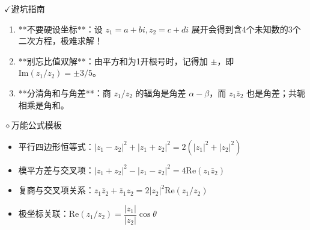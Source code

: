 \documentclass{exam-zh}
\newcommand{\eduIconCheck}{\(\checkmark\)}
\newcommand{\eduIconPin}{\(\diamond\)}
\newenvironment{eduBulletList}{%
  \begin{itemize}[
    label=\textbullet,
    leftmargin=5mm,
    itemsep=1.2mm,
    topsep=0pt,
    parsep=0pt
  ]
}{%
  \end{itemize}
}
\newenvironment{eduBottomGrid}{%
  \vspace{1mm}
  \par\noindent
}{%
  \par\vspace{1mm}
}
\newenvironment{eduSummaryLeft}{%
  \begin{minipage}[t]{0.30\linewidth}
}{%
  \end{minipage}
}
\newcommand{\eduSummaryDivider}{%
  \hspace{4mm}{\color{edu-line}\vrule width 0.35pt}\hspace{7mm}%
}
\newenvironment{eduSummaryRight}{%
  \begin{minipage}[t]{0.58\linewidth}
}{%
  \end{minipage}
}
\newenvironment{eduPlainList}{%
  \begin{enumerate}[
    label=(\arabic*),
    leftmargin=7mm,
    itemsep=1.2mm,
    topsep=0pt,
    parsep=0pt
  ]
}{%
  \end{enumerate}
}
\begin{document}
\begin{eduBottomGrid}
  \begin{eduSummaryLeft}
    \begin{eduSummaryBlock}{\eduIconCheck}{避坑指南}
    \begin{eduPlainList}
      \item **不要硬设坐标**：设 $z_1=a+bi, z_2=c+di$ 展开会得到含4个未知数的3个二次方程，极难求解！      \item **别忘比值双解**：由平方和为1开根号时，记得加 $\pm$，即 $\mathrm{Im}(z_1/z_2) = \pm 3/5$。      \item **分清角和与角差**：商 $z_1/z_2$ 的辐角是角差 $\alpha - \beta$，而 $z_1\bar{z}_2$ 也是角差；共轭相乘是角和。    \end{eduPlainList}
    \end{eduSummaryBlock}
  \end{eduSummaryLeft}
  \eduSummaryDivider
  \begin{eduSummaryRight}
    \begin{eduSummaryBlock}{\eduIconPin}{万能公式模板}
    \begin{eduBulletList}
      \item 平行四边形恒等式：$|z_1-z_2|^2+|z_1+z_2|^2 = 2(|z_1|^2+|z_2|^2)$      \item 模平方差与交叉项：$|z_1+z_2|^2-|z_1-z_2|^2 = 4\mathrm{Re}(z_1\bar{z}_2)$      \item 复商与交叉项关系：$z_1\bar{z}_2+\bar{z}_1z_2 = 2|z_2|^2\mathrm{Re}(z_1/z_2)$      \item 极坐标关联：$\mathrm{Re}(z_1/z_2) = \dfrac{|z_1|}{|z_2|}\cos\theta$    \end{eduBulletList}
    \end{eduSummaryBlock}
  \end{eduSummaryRight}
\end{eduBottomGrid}
\end{document}
